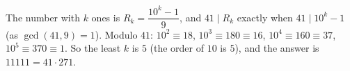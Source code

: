 The number with $k$ ones is $R_k=\dfrac{10^k-1}{9}$, and $41\mid R_k$ exactly when $41\mid10^k-1$ (as $\gcd(41,9)=1$). Modulo $41$: $10^2\equiv18$, $10^3\equiv180\equiv16$, $10^4\equiv160\equiv37$, $10^5\equiv370\equiv1$. So the least $k$ is $5$ (the order of $10$ is $5$), and the answer is $\boxed{11111}=41\cdot271$.
